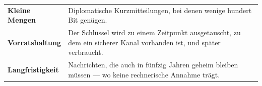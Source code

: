 \begin{aufgabe}
\begin{center}
{\small
\renewcommand{\arraystretch}{1.5}
\begin{tabular}{@{}P{2.4cm}P{6.2cm}@{}}
\toprule
\textbf{Kleine Mengen} & Diplomatische Kurzmitteilungen, bei denen wenige hundert Bit genügen.\\
\textbf{Vorratshaltung} & Der Schlüssel wird zu einem Zeitpunkt ausgetauscht, zu dem ein sicherer Kanal vorhanden ist, und später verbraucht.\\
\textbf{Langfristigkeit} & Nachrichten, die auch in fünfzig Jahren geheim bleiben müssen --- wo keine rechnerische Annahme trägt.\\
\bottomrule
\end{tabular}}
\end{center}

\begin{center}
\begin{minipage}{0.88\textwidth}
\end{minipage}
\end{center}
\end{aufgabe}

